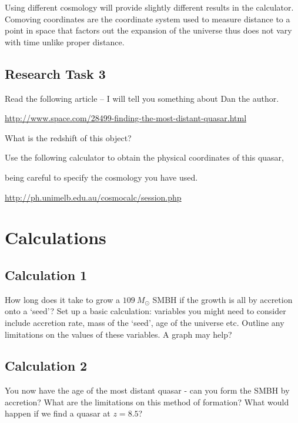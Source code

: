 \documentclass[a4paper]{article} %
\begin{document}
 


Using different cosmology will provide slightly different results in the calculator. 
Comoving coordinates are the coordinate system used to measure distance to a point in space that factors out the expansion of the universe thus does not vary with time unlike proper distance. 



\subsection{Research Task 3}
\begin{framed}
Read the following article – I will tell you something about Dan the author.

\url{http://www.space.com/28499-finding-the-most-distant-quasar.html}

What is the redshift of this object?

Use the following calculator to obtain the physical coordinates of this quasar,

being careful to specify the cosmology you have used.

\url{http://ph.unimelb.edu.au/cosmocalc/session.php}
\end{framed}


\section{Calculations}

\subsection{Calculation 1}
\begin{framed}
How long does it take to grow a $109~M_\odot$ SMBH if the growth is all by accretion onto a `seed'? Set up a basic calculation: variables you might need to consider include accretion rate, mass of the `seed', age of the universe etc. Outline any limitations on the values of these variables. A graph may help?
\end{framed}

\subsection{Calculation 2}
\begin{framed}
You now have the age of the most distant quasar - can you form the SMBH by accretion? What are the limitations on this method of formation? What would happen if we find a quasar at $z=8.5$?
\end{framed}
\end{document}

